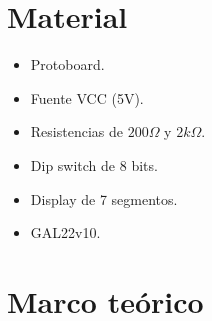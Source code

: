 \documentclass[12pt, oneside, openany]{article}
\begin{document}
\section{Material}
{\sffamily\large
    \begin{itemize}
        \item Protoboard.
        \item Fuente VCC (5V).
        \item Resistencias de $200\Omega$ y $2k\Omega$.
        \item Dip switch de 8 bits.
        \item Display de 7 segmentos.
        \item GAL22v10.
    \end{itemize}
}

\newpage
\section{Marco teórico}
\end{document}
